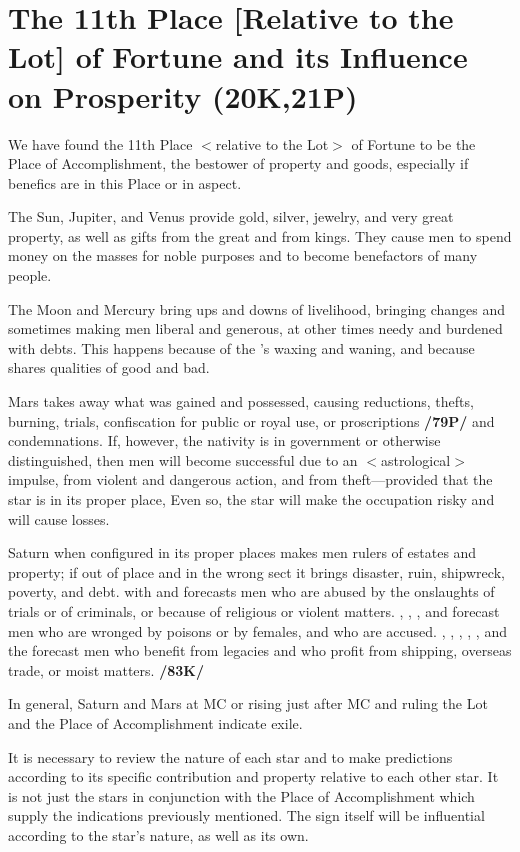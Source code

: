 \section{The 11th Place [Relative to the Lot] of Fortune and its Influence on Prosperity (20K,21P)}

We have found the 11th Place $<$relative to the Lot$>$ of Fortune to be the Place of Accomplishment, the bestower of property and goods, especially if benefics are in this Place or in aspect. 

The Sun, Jupiter, and Venus provide gold, silver, jewelry, and very great property, as well as gifts from the great and from kings. They cause men to spend money on the masses for noble purposes and to become benefactors of many
people. 

The Moon and Mercury bring ups and downs of livelihood, bringing changes and sometimes making men liberal and generous, at other times needy and burdened with debts. This happens because of the \Moon’s waxing and waning, and because \Mercury\xspace shares qualities of good and bad. 

Mars takes away what was gained and possessed, causing reductions, thefts, burning, trials, confiscation for public or royal use, or proscriptions \textbf{/79P/} and condemnations. If, however, the nativity is in government or otherwise distinguished, then men will become successful due to an $<$astrological$>$ impulse, from violent and dangerous action, and from theft—provided that the star is in its proper place, Even so, the star will make the occupation risky and will cause losses. 

Saturn when configured in its proper places makes men rulers of estates and property; if out of place and in the wrong sect it brings disaster, ruin, shipwreck, poverty, and
debt. \Saturn\xspace with \Mercury\xspace and \Mars\xspace forecasts men who are abused by the onslaughts of trials or of criminals, or because of religious or violent matters. \Saturn, \Mercury, \Mars, and \Venus forecast men who are wronged by poisons or by females, and who are accused. \Saturn, \Mars, \Mercury, \Venus, \Jupiter, and the \Moon\xspace forecast men who benefit from legacies and who profit from shipping, overseas trade, or moist matters. \textbf{/83K/}

In general, Saturn and Mars at MC or rising just after MC and ruling the Lot and the Place of Accomplishment indicate exile.

\mndl [0.2cm]
It is necessary to review the nature of each star and to make predictions according to its specific contribution and property relative to each other star. It is not just the stars in conjunction with the Place of Accomplishment which supply the indications previously mentioned. The sign itself will be influential according to the star’s nature, as well as its own.

\newpage